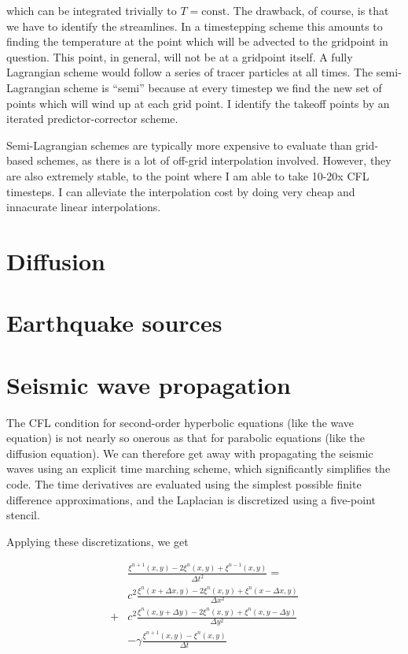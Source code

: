 \documentclass[a4paper,10pt]{article}
\begin{document}
which can be integrated trivially to $T=\mathrm{const}$.
The drawback, of course, is that we have to identify the streamlines.
In a timestepping scheme this amounts to finding the temperature at the point which will be advected to the gridpoint in question.
This point, in general, will not be at a gridpoint itself.
A fully Lagrangian scheme would follow a series of tracer particles at all times.  
The semi-Lagrangian scheme is ``semi'' because at every timestep we find the new set of points which will wind up at each grid point.
I identify the takeoff points by an iterated predictor-corrector scheme.

Semi-Lagrangian schemes are typically more expensive to evaluate than grid-based schemes, as there is a lot of off-grid interpolation involved.  
However, they are also extremely stable, to the point where I am able to take 10-20x CFL timesteps.
I can alleviate the interpolation cost by doing very cheap and innacurate linear interpolations.

\section{Diffusion}

\section{Earthquake sources}

\section{Seismic wave propagation}

The CFL condition for second-order hyperbolic equations (like the wave equation) is not nearly so onerous as that for parabolic equations (like the diffusion equation).
We can therefore get away with propagating the seismic waves using an explicit time marching scheme, which significantly simplifies the code.
The time derivatives are evaluated using the simplest possible finite difference approximations, and the Laplacian is discretized using a five-point stencil.

Applying these discretizations, we get


\begin{equation}
\begin{aligned}
& \frac{\xi^{n+1}(x,y) - 2 \xi^{n}(x,y) + \xi^{n-1}(x,y) }{\Delta t^2}  = \\
 &c^2 \frac{\xi^{n}(x+\Delta x, y)  -2 \xi^{n}(x,y) + \xi^{n}(x-\Delta x, y)}{\Delta x^2} \\
 + &c^2 \frac{\xi^{n}(x, y+ \Delta y)  -2 \xi^{n}(x,y) + \xi^{n}(x, y-\Delta y)}{\Delta y^2} \\
& - \gamma \frac{\xi^{n+1}(x,y) - \xi^{n}(x,y) }{\Delta t}
\end{aligned}
\end{equation}
\end{document}
